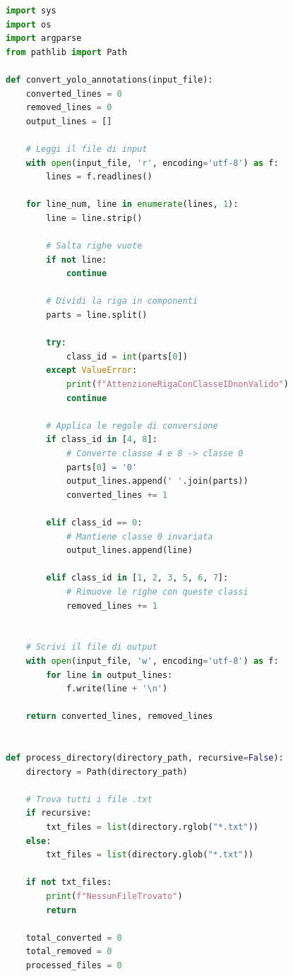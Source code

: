 \documentclass[12pt]{article}
\begin{document}
\begin{lstlisting}[language=Python, caption={Esempio di codice per il remapping del formato YOLO}, label={lst:remapping-yolo}]
import sys
import os
import argparse
from pathlib import Path

def convert_yolo_annotations(input_file):    
    converted_lines = 0
    removed_lines = 0
    output_lines = []
    
    # Leggi il file di input
    with open(input_file, 'r', encoding='utf-8') as f:
        lines = f.readlines()
    
    for line_num, line in enumerate(lines, 1):
        line = line.strip()
        
        # Salta righe vuote
        if not line:
            continue
            
        # Dividi la riga in componenti
        parts = line.split()
        
        try:
            class_id = int(parts[0])
        except ValueError:
            print(f"AttenzioneRigaConClasseIDnonValido")
            continue
        
        # Applica le regole di conversione
        if class_id in [4, 8]:
            # Converte classe 4 e 8 -> classe 0
            parts[0] = '0'
            output_lines.append(' '.join(parts))
            converted_lines += 1
            
        elif class_id == 0:
            # Mantiene classe 0 invariata
            output_lines.append(line)
            
        elif class_id in [1, 2, 3, 5, 6, 7]:
            # Rimuove le righe con queste classi
            removed_lines += 1
    

    # Scrivi il file di output
    with open(input_file, 'w', encoding='utf-8') as f:
        for line in output_lines:
            f.write(line + '\n')
    
    return converted_lines, removed_lines


def process_directory(directory_path, recursive=False):
    directory = Path(directory_path)
    
    # Trova tutti i file .txt
    if recursive:
        txt_files = list(directory.rglob("*.txt"))
    else:
        txt_files = list(directory.glob("*.txt"))
    
    if not txt_files:
        print(f"NessunFileTrovato")
        return
    
    total_converted = 0
    total_removed = 0
    processed_files = 0
    

\end{lstlisting}
\end{document}
